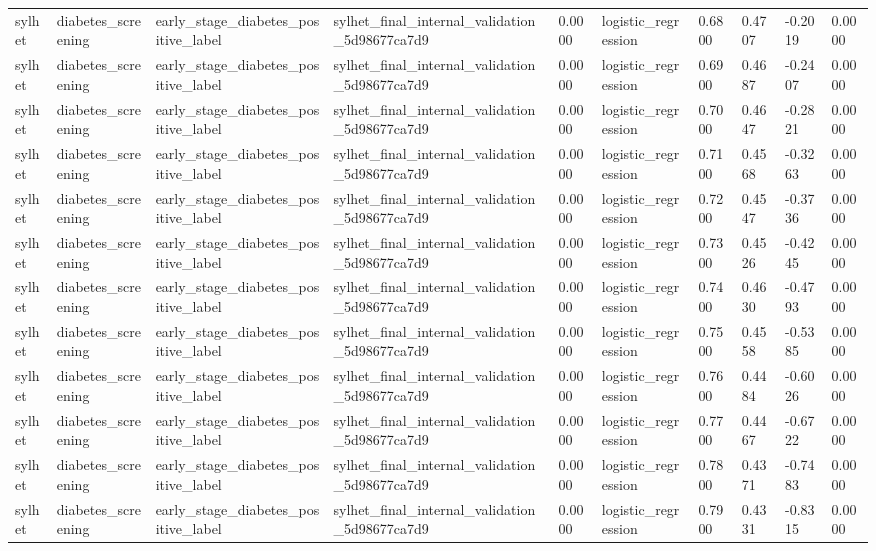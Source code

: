 \begin{tabular}{llllllllll}
sylhet & diabetes\_screening & early\_stage\_diabetes\_positive\_label & sylhet\_final\_internal\_validation\_5d98677ca7d9 & 0.0000 & logistic\_regression & 0.6800 & 0.4707 & -0.2019 & 0.0000 \\
sylhet & diabetes\_screening & early\_stage\_diabetes\_positive\_label & sylhet\_final\_internal\_validation\_5d98677ca7d9 & 0.0000 & logistic\_regression & 0.6900 & 0.4687 & -0.2407 & 0.0000 \\
sylhet & diabetes\_screening & early\_stage\_diabetes\_positive\_label & sylhet\_final\_internal\_validation\_5d98677ca7d9 & 0.0000 & logistic\_regression & 0.7000 & 0.4647 & -0.2821 & 0.0000 \\
sylhet & diabetes\_screening & early\_stage\_diabetes\_positive\_label & sylhet\_final\_internal\_validation\_5d98677ca7d9 & 0.0000 & logistic\_regression & 0.7100 & 0.4568 & -0.3263 & 0.0000 \\
sylhet & diabetes\_screening & early\_stage\_diabetes\_positive\_label & sylhet\_final\_internal\_validation\_5d98677ca7d9 & 0.0000 & logistic\_regression & 0.7200 & 0.4547 & -0.3736 & 0.0000 \\
sylhet & diabetes\_screening & early\_stage\_diabetes\_positive\_label & sylhet\_final\_internal\_validation\_5d98677ca7d9 & 0.0000 & logistic\_regression & 0.7300 & 0.4526 & -0.4245 & 0.0000 \\
sylhet & diabetes\_screening & early\_stage\_diabetes\_positive\_label & sylhet\_final\_internal\_validation\_5d98677ca7d9 & 0.0000 & logistic\_regression & 0.7400 & 0.4630 & -0.4793 & 0.0000 \\
sylhet & diabetes\_screening & early\_stage\_diabetes\_positive\_label & sylhet\_final\_internal\_validation\_5d98677ca7d9 & 0.0000 & logistic\_regression & 0.7500 & 0.4558 & -0.5385 & 0.0000 \\
sylhet & diabetes\_screening & early\_stage\_diabetes\_positive\_label & sylhet\_final\_internal\_validation\_5d98677ca7d9 & 0.0000 & logistic\_regression & 0.7600 & 0.4484 & -0.6026 & 0.0000 \\
sylhet & diabetes\_screening & early\_stage\_diabetes\_positive\_label & sylhet\_final\_internal\_validation\_5d98677ca7d9 & 0.0000 & logistic\_regression & 0.7700 & 0.4467 & -0.6722 & 0.0000 \\
sylhet & diabetes\_screening & early\_stage\_diabetes\_positive\_label & sylhet\_final\_internal\_validation\_5d98677ca7d9 & 0.0000 & logistic\_regression & 0.7800 & 0.4371 & -0.7483 & 0.0000 \\
sylhet & diabetes\_screening & early\_stage\_diabetes\_positive\_label & sylhet\_final\_internal\_validation\_5d98677ca7d9 & 0.0000 & logistic\_regression & 0.7900 & 0.4331 & -0.8315 & 0.0000 \\

\end{tabular}
